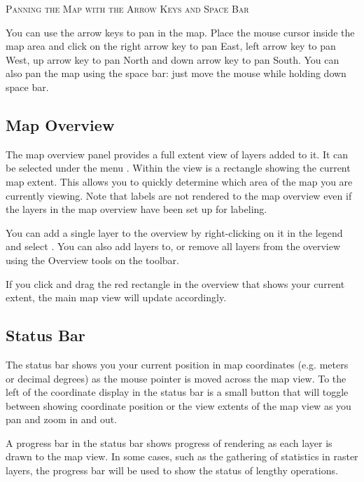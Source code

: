 \begin{Tip}\caption{\textsc{Panning the Map with the Arrow Keys and Space
Bar}}
You can use the arrow keys to pan in the map. Place the mouse cursor
inside the map area and click on the right arrow key to pan East, left arrow
key to pan West, up arrow key to pan North and down arrow key to pan South.
You can also pan the map using the space bar: just move the mouse while
holding down space bar.
\end{Tip}

\subsection{Map Overview}\label{label_mapoverview}

The map overview panel provides a full extent view of layers added to it. It
can be selected under the menu  \arrow {}.
Within the view is a rectangle showing the current map extent. This allows
you to quickly determine which area of the map you are currently viewing. Note
that labels are not rendered to the map overview even if the layers in the
map overview have been set up for labeling.

You can add a single layer to the overview by right-clicking on it in the
legend and select . You can also add layers to,
or remove all layers from the overview using the Overview tools on the toolbar.

If you click and drag the red rectangle in the overview that shows your
current extent, the main map view will update accordingly.

\subsection{Status Bar}\label{label_statusbar}

The status bar shows you your current position in map coordinates (e.g.
meters or decimal degrees) as the mouse pointer is moved across the map view.
To the left of the coordinate display in the status bar is a small button that
will toggle between showing coordinate position or the view extents of the
map view as you pan and zoom in and out.

A progress bar in the status bar shows progress of rendering
as each layer is drawn to the map view. In some cases, such as the gathering
of statistics in raster layers, the progress bar will be used to show the
status of lengthy operations.


